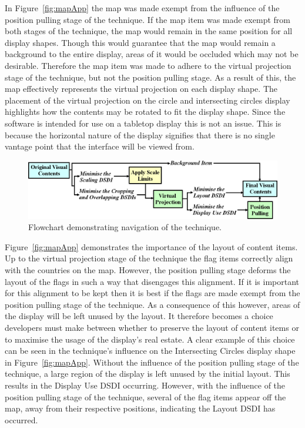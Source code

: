\documentclass[review,5p,times,twocolumn]{elsarticle}
\begin{document}
In Figure~\ref{fig:mapApp} the map was made exempt from the influence of the position pulling stage of the technique.
If the map item was made exempt from both stages of the technique, the map would remain in the same position for all display shapes.
Though this would guarantee that the map would remain a background to the entire display, areas of it would be occluded which may not be desirable.
Therefore the map item was made to adhere to the virtual projection stage of the technique, but not the position pulling stage.
As a result of this, the map effectively represents the virtual projection on each display shape.
The placement of the virtual projection on the circle and intersecting circles display highlights how the contents may be rotated to fit the display shape.
Since the software is intended for use on a tabletop display this is not an issue.
This is because the horizontal nature of the display signifies that there is no single vantage point that the interface will be viewed from.

\begin{figure}[t] 
 \centering
   \includegraphics[width=1\textwidth]{figures/solution_flow.png}
   \caption{Flowchart demonstrating navigation of the technique.}
   \label{fig:flowchart}
\end{figure}

Figure~\ref{fig:mapApp} demonstrates the importance of the layout of content items.
Up to the virtual projection stage of the technique the flag items correctly align with the countries on the map.
However, the position pulling stage deforms the layout of the flags in such a way that disengages this alignment.
If it is important for this alignment to be kept then it is best if the flags are made exempt from the position pulling stage of the technique.
As a consequence of this however, areas of the display will be left unused by the layout.
It therefore becomes a choice developers must make between whether to preserve the layout of content items or to maximise the usage of the display's real estate.
A clear example of this choice can be seen in the technique's influence on the Intersecting Circles display shape in Figure~\ref{fig:mapApp}.
Without the influence of the position pulling stage of the technique, a large region of the display is left unused by the initial layout.
This results in the Display Use \ac{DSDI} occurring.
However, with the influence of the position pulling stage of the technique, several of the flag items appear off the map, away from their respective positions, indicating the Layout \ac{DSDI} has occurred.
\end{document}
